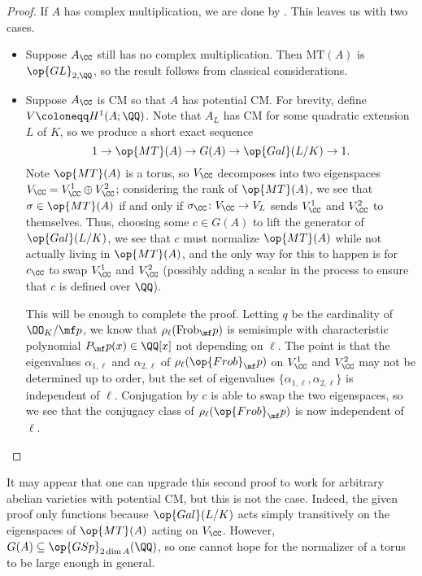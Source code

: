 \documentclass{article}
\begin{document}
\begin{proof}
	If $A$ has complex multiplication, we are done by . This leaves us with two cases.
	\begin{itemize}
		\item Suppose $A_\CC$ still has no complex multiplication. Then $\mathrm{MT}(A)$ is $\op{GL}_{2,\QQ}$, so the result follows from classical considerations.
		\item Suppose $A_\CC$ is CM so that $A$ has potential CM. For brevity, define $V\coloneqq H^1(A;\QQ)$. Note that $A_L$ has CM for some quadratic extension $L$ of $K$, so we produce a short exact sequence
		\[1\to\op{MT}(A)\to G(A)\to\op{Gal}(L/K)\to1.\]
		Note $\op{MT}(A)$ is a torus, so $V_\CC$ decomposes into two eigenspaces $V_\CC=V^1_\CC\oplus V^2_\CC$; considering the rank of $\op{MT}(A)$, we see that $\sigma\in\op{MT}(A)$ if and only if $\sigma_\CC\colon V_\CC\to V_L$ sends $V^1_\CC$ and $V^2_\CC$ to themselves. Thus, choosing some $c\in G(A)$ to lift the generator of $\op{Gal}(L/K)$, we see that $c$ must normalize $\op{MT}(A)$ while not actually living in $\op{MT}(A)$, and the only way for this to happen is for $c_\CC$ to swap $V^1_\CC$ and $V^2_\CC$ (possibly adding a scalar in the process to ensure that $c$ is defined over $\QQ$).
		
		This will be enough to complete the proof. Letting $q$ be the cardinality of $\OO_K/\mf p$, we know that $\rho_\ell(\mathrm{Frob}_\mf p)$ is semisimple with characteristic polynomial $P_\mf p(x)\in\QQ[x]$ not depending on $\ell$. The point is that the eigenvalues $\alpha_{1,\ell}$ and $\alpha_{2,\ell}$ of $\rho_\ell(\op{Frob}_\mf p)$ on $V^1_\CC$ and $V^2_\CC$ may not be determined up to order, but the set of eigenvalues $\{\alpha_{1,\ell},\alpha_{2,\ell}\}$ is independent of $\ell$. Conjugation by $c$ is able to swap the two eigenspaces, so we see that the conjugacy class of $\rho_\ell(\op{Frob}_\mf p)$ is now independent of $\ell$.
		\qedhere
	\end{itemize}
\end{proof}
\begin{remark}
	It may appear that one can upgrade this second proof to work for arbitrary abelian varieties with potential CM, but this is not the case. Indeed, the given proof only functions because $\op{Gal}(L/K)$ acts simply transitively on the eigenspaces of $\op{MT}(A)$ acting on $V_\CC$. However, $G(A)\subseteq\op{GSp}_{2\dim A}(\QQ)$, so one cannot hope for the normalizer of a torus to be large enough in general.
\end{remark}
\end{document}
